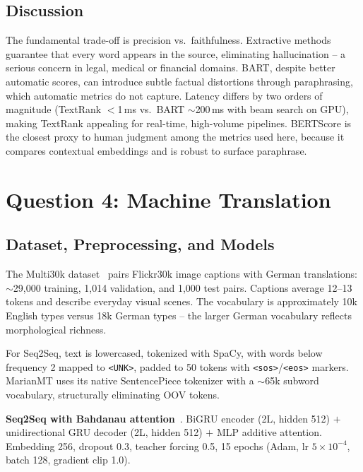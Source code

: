 \documentclass[11pt,a4paper]{article}
\begin{document}
\subsection{Discussion}
The fundamental trade-off is precision vs.\ faithfulness. Extractive methods guarantee that every word appears in the source, eliminating hallucination -- a serious concern in legal, medical or financial domains. BART, despite better automatic scores, can introduce subtle factual distortions through paraphrasing, which automatic metrics do not capture. Latency differs by two orders of magnitude (TextRank $<$1\,ms vs.\ BART $\sim$200\,ms with beam search on GPU), making TextRank appealing for real-time, high-volume pipelines. BERTScore is the closest proxy to human judgment among the metrics used here, because it compares contextual embeddings and is robust to surface paraphrase.

\section{Question 4: Machine Translation}

\subsection{Dataset, Preprocessing, and Models}
The Multi30k dataset~\cite{elliott2016multi30k} pairs Flickr30k image captions with German translations: $\sim$29{,}000 training, 1{,}014 validation, and 1{,}000 test pairs. Captions average 12--13 tokens and describe everyday visual scenes. The vocabulary is approximately 10k English types versus 18k German types -- the larger German vocabulary reflects morphological richness.

For Seq2Seq, text is lowercased, tokenized with SpaCy, with words below frequency 2 mapped to \texttt{<UNK>}, padded to 50 tokens with \texttt{<sos>}/\texttt{<eos>} markers. MarianMT uses its native SentencePiece tokenizer with a $\sim$65k subword vocabulary, structurally eliminating OOV tokens.

\textbf{Seq2Seq with Bahdanau attention}~\cite{bahdanau2015neural}. BiGRU encoder (2L, hidden 512) $+$ unidirectional GRU decoder (2L, hidden 512) $+$ MLP additive attention. Embedding 256, dropout 0.3, teacher forcing 0.5, 15 epochs (Adam, lr $5{\times}10^{-4}$, batch 128, gradient clip 1.0).
\end{document}
